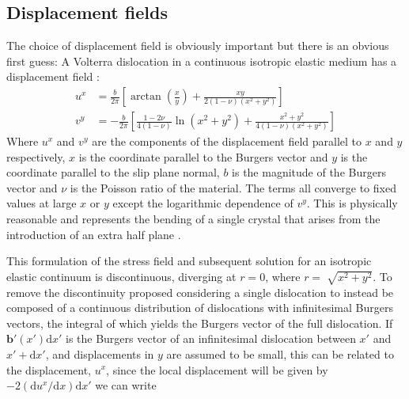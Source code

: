 \FloatBarrier














\subsection{Displacement fields}

The choice of displacement field is obviously important but there is an obvious first guess: A Volterra dislocation in a continuous isotropic elastic medium has a displacement field \cite{hirth_lothe1982volterra_displacements}:
\begin{subequations}
\begin{align}
u^x &= \frac{b}{2\pi}\left[ \arctan\left(\frac{x}{y}\right) + \frac{xy}{2(1-\nu)(x^2 + y^2)} \right] \\[0.5ex]
v^y &= -\frac{b}{2\pi} \left[ \frac{1-2\nu}{4(1-\nu)} \ln(x^2 + y^2) + \frac{x^2 + y^2}{4(1-\nu)(x^2 + y^2)} \right]
\end{align}
\end{subequations}
Where $u^x$ and $v^y$ are the components of the displacement field parallel to $x$ and $y$ respectively, $x$ is the coordinate parallel to the Burgers vector and $y$ is the coordinate parallel to the slip plane normal, $b$ is the magnitude of the Burgers vector and $\nu$ is the Poisson ratio of the material. The terms all converge to fixed values at large $x$ or $y$ except the logarithmic dependence of $v^y$. This is physically reasonable and represents the bending of a single crystal that arises from the introduction of an extra half plane \cite{hirth_lothe1982volterra_displacements}.

This formulation of the stress field and subsequent solution for an isotropic elastic continuum is discontinuous, diverging at $r=0$, where $r=\sqrt[]{x^2+y^2}$. To remove the discontinuity \citet{Eshelby1949} proposed considering a single dislocation to instead be composed of a continuous distribution of dislocations with infinitesimal Burgers vectors, the integral of which yields the Burgers vector of the full dislocation. If $\bm{b}'(x')\mathrm{d}x'$ is the Burgers vector of an infinitesimal dislocation between $x'$ and $x'+\mathrm{d} x'$, and displacements in $y$ are assumed to be small, this can be related to the displacement, $u^x$, since the local displacement will be given by $-2(\mathrm{d} u^x/\mathrm{d} x)\mathrm{d} x'$ \cite{hirth_lothe1982peierls_displacements} we can write


